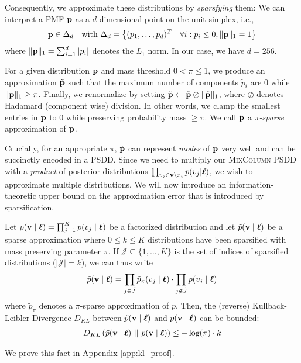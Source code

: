 Consequently, we approximate these distributions by \textit{sparsfying} them: We can interpret a PMF $\mathbf{p}$ as a $d$-dimensional point on the unit simplex, i.e., 
\begin{align}
\mathbf{p} \in \Delta_{d} \quad \text{with } \Delta_{d} = \left\{ (p_1,\dots,p_d)^T \ | \ \forall i: p_i \leq 0, \|\mathbf{p}\|_1 = 1 \right\}
\end{align}
where $\|\mathbf{p}\|_1 = \sum_{i=1}^d |p_i|$ denotes the $L_1$ norm. In our case, we have $d=256$.

For a given distribution $\mathbf{p}$ and mass threshold $0 < \pi \leq 1$, we produce an approximation $\tilde{\mathbf{p}}$ such that the maximum number of components $\tilde{p}_i$ are $0$ while $\|\mathbf{p}\|_1 \geq \pi$. Finally, we renormalize by setting $\tilde{\mathbf{p}} \leftarrow \tilde{\mathbf{p}} \oslash \|\tilde{\mathbf{p}}\|_1$, where $\oslash$ denotes Hadamard (component wise) division. In other words, we clamp the smallest entries in $\mathbf{p}$ to $0$ while preserving probability mass $\geq \pi$. We call $\tilde{\mathbf{p}}$ a \textit{$\pi$-sparse} approximation of $\mathbf{p}$.

Crucially, for an appropriate $\pi$, $\tilde{\mathbf{p}}$ can represent \textit{modes} of $\mathbf{p}$ very well and can be succinctly encoded in a PSDD.
Since we need to multiply our \textsc{MixColumn} PSDD with a \textit{product} of posterior distributions $\prod_{v_j \in \mathbf{v} \setminus x_i} p(v_j | \boldsymbol{\ell})$, we wish to approximate multiple distributions. 
We will now introduce an information-theoretic upper bound on the approximation error that is introduced by sparsification. 
\begin{theorem}
    \label{theorem:kl}
    Let $p(\mathbf{v} \mid \boldsymbol{\ell}) = \prod_{j=1}^K p(v_j \mid \boldsymbol{\ell})$ be a factorized distribution and let $\tilde{p}(\mathbf{v} \mid \boldsymbol{\ell})$ be a sparse approximation where $0 \leq k \leq K$ distributions have been sparsified with mass preserving parameter $\pi$. If $\mathcal{J} \subseteq \{1,\dots,K\}$ is the set of indices of sparsified distributions ($|\mathcal{J}| = k$), we can thus write
    \begin{align}
        \tilde{p}(\mathbf{v} \mid \boldsymbol{\ell}) = \prod_{j \in \tilde{J}} \tilde{p}_\pi(v_j \mid \boldsymbol{\ell}) \cdot \prod_{j \notin \tilde{J}} p(v_j \mid \boldsymbol{\ell})
    \end{align}
    where $\tilde{p}_\pi$ denotes a $\pi$-sparse approximation of $p$. Then, the (reverse) Kullback-Leibler Divergence $D_{KL}$ between $\tilde{p}(\mathbf{v} \mid \boldsymbol{\ell})$ and $p(\mathbf{v} \mid \boldsymbol{\ell})$ can be bounded:
    \begin{align}
        D_{KL}\left( \tilde{p}(\mathbf{v} \mid \boldsymbol{\ell}) \ || \ p(\mathbf{v} \mid \boldsymbol{\ell}) \right) \leq -\log(\pi) \cdot k
    \end{align}
\end{theorem}
We prove this fact in Appendix \ref{app:kl_proof}.

